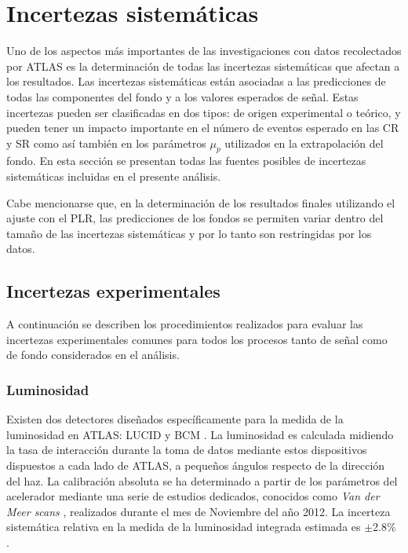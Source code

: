 \section{Incertezas sistemáticas}
\label{sec:sistematicos}

Uno de los aspectos más importantes de las investigaciones con datos recolectados
por ATLAS es la determinación de todas las incertezas sistemáticas que afectan a
los resultados. Las incertezas sistemáticas están asociadas a las predicciones
de todas las componentes del fondo y a los valores esperados de señal. Estas
incertezas pueden ser clasificadas en dos tipos: de origen experimental o
teórico, y pueden tener un impacto importante en el número de eventos esperado
en las CR y SR como así también en los parámetros $\mu_p$ utilizados en la
extrapolación del fondo. En esta sección se presentan todas las fuentes
posibles de incertezas sistemáticas incluidas en el presente análisis.

Cabe mencionarse que, en la determinación de los resultados finales utilizando
el ajuste con el PLR, las predicciones de los fondos se permiten variar dentro
del tamaño de las incertezas sistemáticas y por lo tanto son restringidas por
los datos.


\subsection{Incertezas experimentales}\label{sec:expsyst}

A continuación se describen los procedimientos realizados para evaluar las
incertezas experimentales comunes para todos los procesos tanto de señal como de
fondo considerados en el análisis.


\subsubsection{Luminosidad}

Existen dos detectores dise\~nados específicamente para la medida de la
luminosidad en ATLAS: LUCID y BCM \cite{lumi2011}. La luminosidad es calculada
midiendo la tasa de interacción durante la toma de datos mediante estos
dispositivos dispuestos a cada lado de ATLAS, a pequeños ángulos respecto de la
dirección del haz. La calibración absoluta se ha determinado a partir de los
parámetros del acelerador mediante una serie de estudios dedicados, conocidos
como \emph{Van der Meer scans} \cite{vanderMeer:296752}, realizados durante el
mes de Noviembre del a\~no 2012. La incerteza sistemática relativa en la medida
de la luminosidad integrada estimada es $\pm$2.8\% \cite{lumi2012}.

